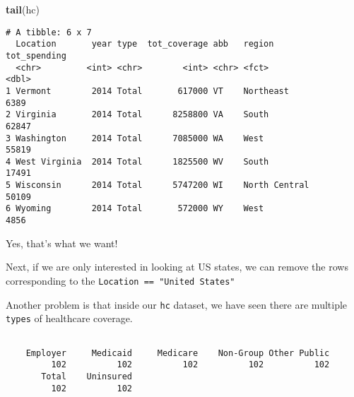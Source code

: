 \documentclass[]{article}
\newenvironment{Shaded}{\begin{snugshade}}{\end{snugshade}}
\newcommand{\KeywordTok}[1]{\textcolor[rgb]{0.13,0.29,0.53}{\textbf{#1}}}
\newcommand{\NormalTok}[1]{#1}
\newcommand{\OperatorTok}[1]{\textcolor[rgb]{0.81,0.36,0.00}{\textbf{#1}}}
\newcommand{\StringTok}[1]{\textcolor[rgb]{0.31,0.60,0.02}{#1}}
\begin{document}
\begin{Shaded}
\begin{Highlighting}[]
\KeywordTok{tail}\NormalTok{(hc)}
\end{Highlighting}
\end{Shaded}

\begin{verbatim}
# A tibble: 6 x 7
  Location       year type  tot_coverage abb   region        tot_spending
  <chr>         <int> <chr>        <int> <chr> <fct>                <dbl>
1 Vermont        2014 Total       617000 VT    Northeast             6389
2 Virginia       2014 Total      8258800 VA    South                62847
3 Washington     2014 Total      7085000 WA    West                 55819
4 West Virginia  2014 Total      1825500 WV    South                17491
5 Wisconsin      2014 Total      5747200 WI    North Central        50109
6 Wyoming        2014 Total       572000 WY    West                  4856
\end{verbatim}

Yes, that's what we want!

Next, if we are only interested in looking at US states, we can remove
the rows corresponding to the \texttt{Location\ ==\ "United\ States"}

\begin{Shaded}
\end{Shaded}

Another problem is that inside our \texttt{hc} dataset, we have seen
there are multiple \texttt{types} of healthcare coverage.

\begin{Shaded}
\end{Shaded}

\begin{verbatim}

    Employer     Medicaid     Medicare    Non-Group Other Public 
         102          102          102          102          102 
       Total    Uninsured 
         102          102 
\end{verbatim}
\end{document}
